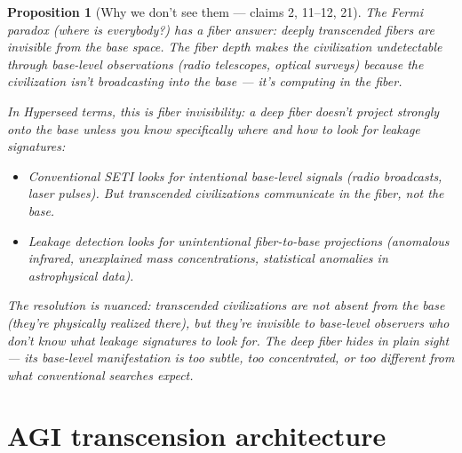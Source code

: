 \documentclass[11pt,a4paper]{article}
\newtheorem{proposition}[definition]{Proposition}
\begin{document}
\begin{proposition}[Why we don't see them --- claims 2, 11--12, 21]
\label{prop:fermi}
The Fermi paradox (where is everybody?) has a fiber answer: deeply
transcended fibers are invisible from the base space. The fiber
depth makes the civilization undetectable through base-level
observations (radio telescopes, optical surveys) because the
civilization isn't broadcasting into the base --- it's computing
in the fiber.

In Hyperseed terms, this is \emph{fiber invisibility}: a deep fiber
doesn't project strongly onto the base unless you know specifically
where and how to look for leakage signatures:
\begin{itemize}
\item Conventional SETI looks for \emph{intentional base-level signals}
  (radio broadcasts, laser pulses). But transcended civilizations
  communicate in the fiber, not the base.
\item Leakage detection looks for \emph{unintentional fiber-to-base
  projections} (anomalous infrared, unexplained mass concentrations,
  statistical anomalies in astrophysical data).
\end{itemize}

The resolution is nuanced: transcended civilizations are not
\emph{absent} from the base (they're physically realized there), but
they're \emph{invisible} to base-level observers who don't know what
leakage signatures to look for. The deep fiber hides in plain sight
--- its base-level manifestation is too subtle, too concentrated, or
too different from what conventional searches expect.
\end{proposition}

\section{AGI transcension architecture}
\label{sec:agi}
\end{document}
